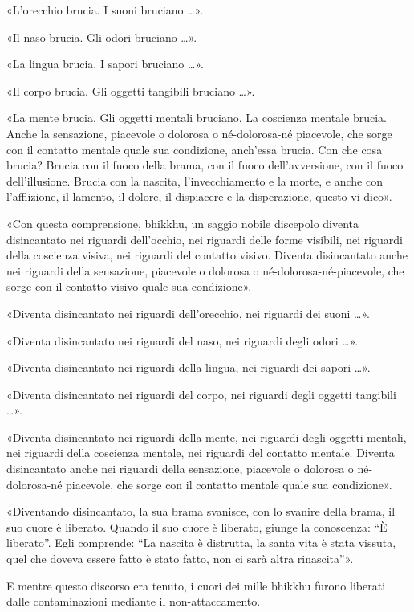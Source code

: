 «L’orecchio brucia. I suoni bruciano …».


«Il naso brucia. Gli odori bruciano …».


«La lingua brucia. I sapori bruciano …».


«Il corpo brucia. Gli oggetti tangibili bruciano …».


«La mente brucia. Gli oggetti mentali bruciano. La coscienza mentale
brucia. Anche la sensazione, piacevole o dolorosa o né-dolorosa-né
piacevole, che sorge con il contatto mentale quale sua condizione,
anch’essa brucia. Con che cosa brucia? Brucia con il fuoco della brama,
con il fuoco dell’avversione, con il fuoco dell’illusione. Brucia con la
nascita, l’invecchiamento e la morte, e anche con l’afflizione, il
lamento, il dolore, il dispiacere e la disperazione, questo vi dico».


«Con questa comprensione, bhikkhu, un saggio nobile discepolo diventa
disincantato nei riguardi dell’occhio, nei riguardi delle forme
visibili, nei riguardi della coscienza visiva, nei riguardi del contatto
visivo. Diventa disincantato anche nei riguardi della sensazione,
piacevole o dolorosa o né-dolorosa-né-piacevole, che sorge con il
contatto visivo quale sua condizione».


«Diventa disincantato nei riguardi dell’orecchio, nei riguardi dei suoni
…».


«Diventa disincantato nei riguardi del naso, nei riguardi degli odori
…».


«Diventa disincantato nei riguardi della lingua, nei riguardi dei sapori
…».


«Diventa disincantato nei riguardi del corpo, nei riguardi degli oggetti
tangibili …».


«Diventa disincantato nei riguardi della mente, nei riguardi degli
oggetti mentali, nei riguardi della coscienza mentale, nei riguardi del
contatto mentale. Diventa disincantato anche nei riguardi della
sensazione, piacevole o dolorosa o né-dolorosa-né piacevole, che sorge
con il contatto mentale quale sua condizione».


«Diventando disincantato, la sua brama svanisce, con lo svanire della
brama, il suo cuore è liberato. Quando il suo cuore è liberato, giunge
la conoscenza: “È liberato”. Egli comprende: “La nascita è distrutta, la
santa vita è stata vissuta, quel che doveva essere fatto è stato fatto,
non ci sarà altra rinascita”».


E mentre questo discorso era tenuto, i cuori dei mille bhikkhu furono
liberati dalle contaminazioni mediante il non-attaccamento.


